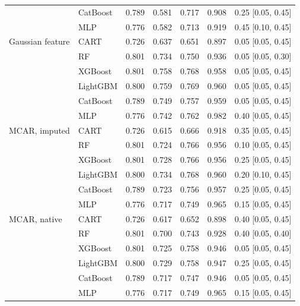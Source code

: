 \documentclass[pdflatex,sn-mathphys]{sn-jnl}
\theoremstyle{thmstyleone}
\begin{document}
\begin{table}[htbp]
\begin{tabular}{@{}llrrrrl@{}}
 & CatBoost & 0.789 & 0.581 & 0.717 & 0.908 & 0.25 [0.05, 0.45] \\
 & MLP & 0.776 & 0.582 & 0.713 & 0.919 & 0.45 [0.10, 0.45] \\
\midrule
Gaussian feature & CART & 0.726 & 0.637 & 0.651 & 0.897 & 0.05 [0.05, 0.45] \\
 & RF & 0.801 & 0.734 & 0.750 & 0.936 & 0.05 [0.05, 0.30] \\
 & XGBoost & 0.801 & 0.758 & 0.768 & 0.958 & 0.05 [0.05, 0.45] \\
 & LightGBM & 0.800 & 0.759 & 0.769 & 0.960 & 0.05 [0.05, 0.45] \\
 & CatBoost & 0.789 & 0.749 & 0.757 & 0.959 & 0.05 [0.05, 0.45] \\
 & MLP & 0.776 & 0.742 & 0.762 & 0.982 & 0.40 [0.05, 0.45] \\
\midrule
MCAR, imputed & CART & 0.726 & 0.615 & 0.666 & 0.918 & 0.35 [0.05, 0.45] \\
 & RF & 0.801 & 0.724 & 0.766 & 0.956 & 0.10 [0.05, 0.45] \\
 & XGBoost & 0.801 & 0.728 & 0.766 & 0.956 & 0.25 [0.05, 0.45] \\
 & LightGBM & 0.800 & 0.734 & 0.768 & 0.960 & 0.20 [0.10, 0.45] \\
 & CatBoost & 0.789 & 0.723 & 0.756 & 0.957 & 0.25 [0.05, 0.45] \\
 & MLP & 0.776 & 0.717 & 0.749 & 0.965 & 0.15 [0.05, 0.45] \\
\midrule
MCAR, native & CART & 0.726 & 0.617 & 0.652 & 0.898 & 0.40 [0.05, 0.45] \\
 & RF & 0.801 & 0.700 & 0.743 & 0.928 & 0.40 [0.05, 0.40] \\
 & XGBoost & 0.801 & 0.725 & 0.758 & 0.946 & 0.05 [0.05, 0.45] \\
 & LightGBM & 0.800 & 0.729 & 0.758 & 0.947 & 0.25 [0.05, 0.45] \\
 & CatBoost & 0.789 & 0.717 & 0.747 & 0.946 & 0.05 [0.05, 0.45] \\
 & MLP & 0.776 & 0.717 & 0.749 & 0.965 & 0.15 [0.05, 0.45] \\
\bottomrule
\end{tabular}
\end{table}
\end{document}
